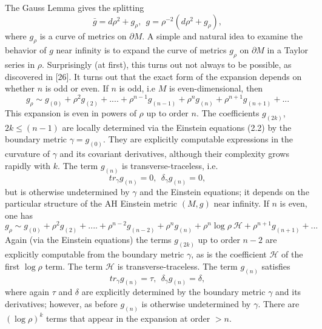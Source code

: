 \documentclass[11pt,amsfonts]{amsart}
\begin{document}
 The Gauss Lemma gives the splitting
\begin{equation} \label{e3.1}
\bar g = d\rho^{2} + g_{\rho}, \ \ g = \rho^{-2}(d\rho^{2} + 
g_{\rho}), 
\end{equation}
where $g_{\rho}$ is a curve of metrics on $\partial M$. A simple and 
natural idea to examine the behavior of $g$ near infinity is to expand 
the curve of metrics $g_{\rho}$ on $\partial M$ in a Taylor series in 
$\rho .$ Surprisingly (at first), this turns out not always to be 
possible, as discovered in [26]. It turns out that the exact form of 
the expansion depends on whether $n$ is odd or even. If $n$ is odd, i.e 
$M$ is even-dimensional, then 
\begin{equation} \label{e3.2}
g_{\rho} \sim  g_{(0)} + \rho^{2}g_{(2)} + .... + \rho^{n-1}g_{(n-1)} + 
\rho^{n}g_{(n)} + \rho^{n+1}g_{(n+1)} + ... 
\end{equation}
This expansion is even in powers of $\rho$ up to order $n$. The 
coefficients $g_{(2k)}$, $2k \leq (n-1)$ are locally determined via the 
Einstein equations (2.2) by the boundary metric $\gamma  = g_{(0)}$. 
They are explicitly computable expressions in the curvature of $\gamma 
$ and its covariant derivatives, although their complexity grows 
rapidly with $k$. The term $g_{(n)}$ is transverse-traceless, i.e.
\begin{equation} \label{e3.3}
tr_{\gamma}g_{(n)} = 0,  \ \ \delta_{\gamma}g_{(n)} = 0, 
\end{equation}
but is otherwise undetermined by $\gamma$ and the Einstein equations; it 
depends on the particular structure of the AH Einstein metric $(M, g)$ near 
infinity. If $n$ is even, one has
\begin{equation} \label{e3.4}
g_{\rho} \sim  g_{(0)} + \rho^{2}g_{(2)} + .... + \rho^{n-2}g_{(n-2)} + 
\rho^{n}g_{(n)} + \rho^{n}\log\rho \ {\mathcal H}  + \rho^{n+1}g_{(n+1)} + 
... 
\end{equation}
Again (via the Einstein equations) the terms $g_{(2k)}$ up to order $n-2$ 
are explicitly computable from the boundary metric $\gamma$, as is the 
coefficient ${\mathcal H}$ of the first $\log\rho$ term. The term 
${\mathcal H}$ is transverse-traceless. The term $g_{(n)}$ satisfies 
\begin{equation} \label{e3.5}
tr_{\gamma}g_{(n)} = \tau , \ \  \delta_{\gamma}g_{(n)} = \delta ,  
\end{equation}
where again $\tau$ and $\delta$ are explicitly determined by the 
boundary metric $\gamma$ and its derivatives; however, as before 
$g_{(n)}$ is otherwise undetermined by $\gamma$. There are $(\log\rho)^{k}$ 
terms that appear in the expansion at order $> n$. 
\end{document}
